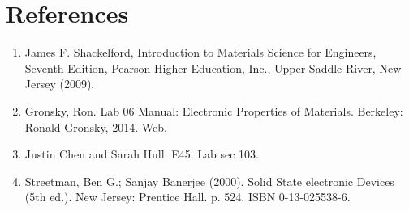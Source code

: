 \documentclass{article}
\begin{document}

\section{References}
\begin{enumerate}
\item James F. Shackelford, Introduction to Materials Science for Engineers, Seventh Edition, Pearson Higher 
Education, Inc., Upper Saddle River, New Jersey (2009).
\item Gronsky, Ron. Lab 06 Manual: Electronic Properties of Materials. Berkeley: Ronald Gronsky, 2014. Web.
\item Justin Chen and Sarah Hull. E45. Lab sec 103.
\item Streetman, Ben G.; Sanjay Banerjee (2000). Solid State electronic Devices (5th ed.). New Jersey: Prentice Hall. p. 524. ISBN 0-13-025538-6.
\end{enumerate}








\end{document}
